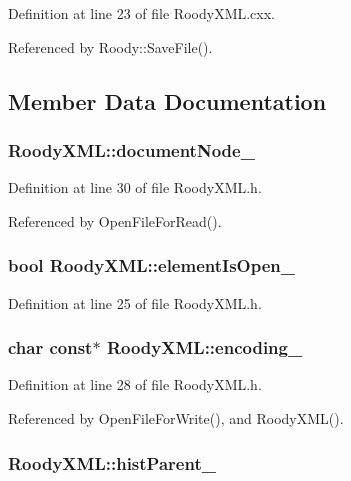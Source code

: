 Definition at line 23 of file RoodyXML.cxx.

Referenced by Roody::SaveFile().

\subsection{Member Data Documentation}
\subsubsection[{documentNode\_\-}]{ {\bf RoodyXML::documentNode\_\-}}\label{classRoodyXML_ae5ece6258f48a6a1c8636af426d5eebf}


Definition at line 30 of file RoodyXML.h.

Referenced by OpenFileForRead().
\subsubsection[{elementIsOpen\_\-}]{\setlength{\rightskip}{0pt plus 5cm}bool {\bf RoodyXML::elementIsOpen\_\-}}\label{classRoodyXML_afd6670c3ae32efb72c22ecbbed426223}


Definition at line 25 of file RoodyXML.h.
\subsubsection[{encoding\_\-}]{\setlength{\rightskip}{0pt plus 5cm}char const$\ast$ {\bf RoodyXML::encoding\_\-}}\label{classRoodyXML_abede48f12f63082bbbbeef3f09d67952}


Definition at line 28 of file RoodyXML.h.

Referenced by OpenFileForWrite(), and RoodyXML().
\subsubsection[{histParent\_\-}]{ {\bf RoodyXML::histParent\_\-}}\label{classRoodyXML_ad46975b1ad12c75a53c771e0f6caeff0}


